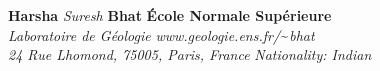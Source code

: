 \documentclass[11pt]{article}
\begin{document}
\baselineskip14pt
\setlength{\parskip}{0pt}
\setmainfont[Mapping=tex-text]{Times New Roman}
\pagestyle{rest}
\setcounter{page}{1}
\setcounter{section}{1}
{\Large \color{BrickRed}\LARGE \textbf{Harsha}} {\Large \color{BrickRed}\LARGE \textit{Suresh}} {\Large \color{BrickRed}\LARGE \textbf{Bhat}} \hfill \textbf{\color{BrickRed}\Large École Normale Supérieure}\\
\textit{\color{Black}Laboratoire de Géologie} \hfill \textit{\color{Black}www.geologie.ens.fr/${\textrm{\symbol{126}}}$bhat}\\
\textit{\color{Black}24 Rue Lhomond, 75005, Paris, France} \hfill \textit{\color{Black}Nationality: Indian}\\
\vspace{3pt}
\end{document}

